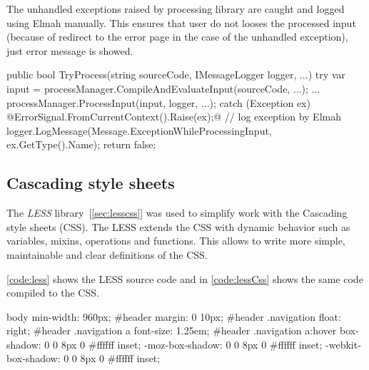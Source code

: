 The unhandled exceptions raised by \lsystem processing library are caught and logged using Elmah manually.
This ensures that user do not looses the processed input (because of redirect to the error page in the case of the unhandled exception), just error message is showed.

\begin{Csharp}[label=code:elmahCode,caption={...}]
public bool TryProcess(string sourceCode, IMessageLogger logger, ...) {
	try {
		var input = processManager.CompileAndEvaluateInput(sourceCode, ...);
		...
		processManager.ProcessInput(input, logger, ...);
	}
	catch (Exception ex) {
		@ErrorSignal.FromCurrentContext().Raise(ex);@  // log exception by Elmah
		logger.LogMessage(Message.ExceptionWhileProcessingInput, ex.GetType().Name);
		return false;
	}
}
\end{Csharp}



\subsection{Cascading style sheets}
\label{sec:implLess}

The \emph{LESS} library~[\ref{sec:lesscss}] was used to simplify work with the Cascading style sheets (CSS).
The LESS extends the CSS with dynamic behavior such as variables, mixins, operations and functions.
This allows to write more simple, maintainable and clear definitions of the CSS.

\autoref{code:less} shows the LESS source code and in \autoref{code:lessCss} shows the same code compiled to the CSS.


\begin{Css}[label=code:lessCss,caption={Compiled LESS code (\autoref{code:less}) to the CSS}]
body { min-width: 960px; }
#header { margin: 0 10px; }
#header .navigation { float: right; }
#header .navigation a { font-size: 1.25em; }
#header .navigation a:hover {
	box-shadow: 0 0 8px 0 #ffffff inset;
	-moz-box-shadow: 0 0 8px 0 #ffffff inset;
	-webkit-box-shadow: 0 0 8px 0 #ffffff inset;
}
\end{Css}



